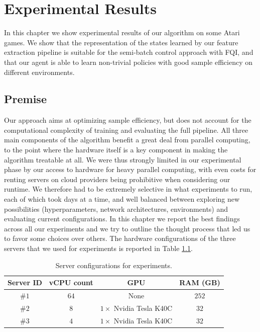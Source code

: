 \chapter{Experimental Results}
\label{chapter6_experiments}
\thispagestyle{empty}

\vspace{0.5cm}

In this chapter we show experimental results of our algorithm on some Atari
games.
We show that the representation of the states learned by our feature extraction 
pipeline is suitable for the semi-batch control approach with FQI, and that 
our agent is able to learn non-trivial policies with good sample efficiency on 
different environments.

\section{Premise}
Our approach aims at optimizing sample efficiency, but does not account for
the computational complexity of training and evaluating the full pipeline. 
All three main components of the algorithm benefit a great deal from parallel 
computing, to the point where the hardware itself is a key component in 
making the algorithm treatable at all. 
We were thus strongly limited in our experimental phase by our access to 
hardware for heavy parallel computing, with even costs for renting servers on 
cloud providers being prohibitive when considering our runtime. 
We therefore had to be extremely selective in what experiments to run, each of 
which took days at a time, and well balanced between exploring new possibilities
(hyperparameters, network architectures, environments) and evaluating current 
configurations. 
In this chapter we report the best findings across all our experiments and we 
try to outline the thought process that led us to favor some choices over others.
The hardware configurations of the three servers that we used for experiments is
reported in Table \ref{t:servers}. 
%
\begin{table}
    \centering
    \begin{tabular}{c c c c} 
	\hline
	Server ID & vCPU count & GPU                          & RAM (GB) \\ 
	\hline 
	\#$1$     & $64$       & None                         & $252$ \\
	\#$2$     & $8$        & $1 \times$ Nvidia Tesla K40C & $32$ \\
	\#$3$     & $4$        & $1 \times$ Nvidia Tesla K40C & $32$ \\
	\hline
    \end{tabular}
    \caption[Server configurations for experiments]{Server configurations for 
	     experiments.}
    \label{t:servers}
\end{table}
%

